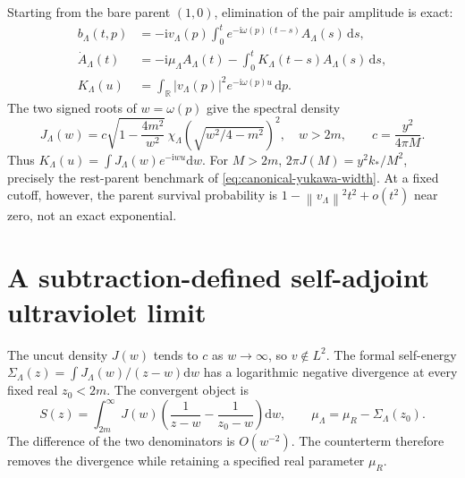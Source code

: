 \documentclass[11pt,a4paper,oneside]{book}
\theoremstyle{plain}
\theoremstyle{definition}
\theoremstyle{remark}
\newcommand{\R}{\mathbb R}
\newcommand{\dd}{\mathrm d}
\newcommand{\ii}{\mathrm i}
\newcommand{\norm}[1]{\left\lVert#1\right\rVert}
\newcommand{\src}[2]{\cite{#1}}
\begin{document}
Starting from the bare parent $(1,0)$, elimination of the pair amplitude
is exact:
\begin{equation}
 \begin{split}
 b_\Lambda(t,p)&=-\ii v_\Lambda(p)\int_0^t
              e^{-\ii\omega(p)(t-s)}A_\Lambda(s)\,\dd s,\\
 \dot A_\Lambda(t)&=-\ii\mu_\Lambda A_\Lambda(t)
       -\int_0^t K_\Lambda(t-s)A_\Lambda(s)\,\dd s,\\
 K_\Lambda(u)&=\int_{\R}|v_\Lambda(p)|^2e^{-\ii\omega(p)u}\,\dd p.
 \end{split}
 \label{eq:one-parent-volterra}
\end{equation}
The two signed roots of $w=\omega(p)$ give the spectral density
\begin{equation}
 J_\Lambda(w)=c\sqrt{1-\frac{4m^2}{w^2}}\,
       \chi_\Lambda\!\left(\sqrt{w^2/4-m^2}\right)^2,
 \quad w>2m,\qquad c=\frac{y^2}{4\pi M}.
 \label{eq:one-parent-spectral-density}
\end{equation}
Thus $K_\Lambda(u)=\int J_\Lambda(w)e^{-\ii wu}\dd w$.
For $M>2m$, $2\pi J(M)=y^2k_*/M^2$, precisely the rest-parent
benchmark of \eqref{eq:canonical-yukawa-width}.  At a fixed cutoff,
however, the parent survival probability is
$1-\norm{v_\Lambda}^2t^2+o(t^2)$ near zero, not an exact exponential.
\src{R20}{thm:v20v46-memory,thm:v20v46-density}

\section{A subtraction-defined self-adjoint ultraviolet limit}
\label{sec:one-parent-renormalization}
The uncut density $J(w)$ tends to $c$ as $w\to\infty$, so $v\notin L^2$.
The formal self-energy
$\Sigma_\Lambda(z)=\int J_\Lambda(w)/(z-w)\dd w$ has a logarithmic
negative divergence at every fixed real $z_0<2m$.  The convergent object is
\begin{equation}
 S(z)=\int_{2m}^\infty J(w)
       \left(\frac1{z-w}-\frac1{z_0-w}\right)\dd w,
 \qquad \mu_\Lambda=\mu_R-\Sigma_\Lambda(z_0).
 \label{eq:one-parent-subtraction}
\end{equation}
The difference of the two denominators is $O(w^{-2})$.  The counterterm
therefore removes the divergence while retaining a specified real
parameter $\mu_R$.
\end{document}
